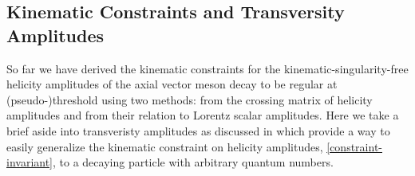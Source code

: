 \subsection{Kinematic Constraints and Transversity Amplitudes} \label{sec:transetivity}
So far we have derived the kinematic constraints for the kinematic-singularity-free helicity amplitudes of the axial vector meson decay to be regular at (pseudo-)threshold using two methods: from the crossing matrix of helicity amplitudes and from their relation to Lorentz scalar amplitudes. Here we take a brief aside into transveristy amplitudes as discussed in \cite{Kotanski1968,Cohen-Tannoudji1968,McKerrell1968} which provide a way to easily generalize the kinematic constraint on helicity amplitudes, \cref{constraint-invariant}, to a decaying particle with arbitrary quantum numbers.


